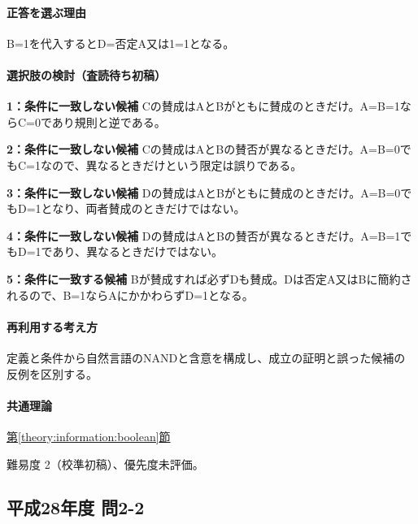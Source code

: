 \paragraph{正答を選ぶ理由} B=\allowbreak{}1を代入するとD=否定A又は1=\allowbreak{}1となる。

\paragraph{選択肢の検討（査読待ち初稿）}\mbox{}\par

\noindent\textbf{1：条件に一致しない候補} Cの賛成はAとBがともに賛成のときだけ。A=\allowbreak{}B=\allowbreak{}1ならC=\allowbreak{}0であり規則と逆である。\par

\noindent\textbf{2：条件に一致しない候補} Cの賛成はAとBの賛否が異なるときだけ。A=\allowbreak{}B=\allowbreak{}0でもC=\allowbreak{}1なので、異なるときだけという限定は誤りである。\par

\noindent\textbf{3：条件に一致しない候補} Dの賛成はAとBがともに賛成のときだけ。A=\allowbreak{}B=\allowbreak{}0でもD=\allowbreak{}1となり、両者賛成のときだけではない。\par

\noindent\textbf{4：条件に一致しない候補} Dの賛成はAとBの賛否が異なるときだけ。A=\allowbreak{}B=\allowbreak{}1でもD=\allowbreak{}1であり、異なるときだけではない。\par

\noindent\textbf{5：条件に一致する候補} Bが賛成すれば必ずDも賛成。Dは否定A又はBに簡約されるので、B=\allowbreak{}1ならAにかかわらずD=\allowbreak{}1となる。\par

\paragraph{再利用する考え方} 定義と条件から自然言語のNANDと含意を構成し、成立の証明と誤った候補の反例を区別する。

\paragraph{共通理論} \hyperref[theory:information:boolean]{第\ref*{theory:information:boolean}節}

\par 難易度 2（校準初稿）、優先度未評価。

\subsection{平成28年度 問2-2}
\label{q:h28-reg-basic-2-2}

